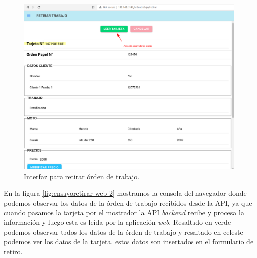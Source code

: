 \begin{figure}[H]
	\centering
	\includegraphics[width=\textwidth]{./Figures/ensayo-1/21.retirar-web-1.png}
	\caption{Interfaz para retirar órden de trabajo.}
	\label{fig:ensayoretirar-web-1}
\end{figure}

En la figura \ref{fig:ensayoretirar-web-2} mostramos la consola del navegador donde podemos observar los datos de la órden de trabajo recibidos desde la API, ya que cuando pasamos la tarjeta por el mostrador la API \textit{backend} recibe y procesa la información y luego esta es leída por la aplicación \textit{web}. Resaltado en verde podemos observar todos los datos de la órden de trabajo y resaltado en celeste podemos ver los datos de la tarjeta. estos datos son insertados en el formulario de retiro.

